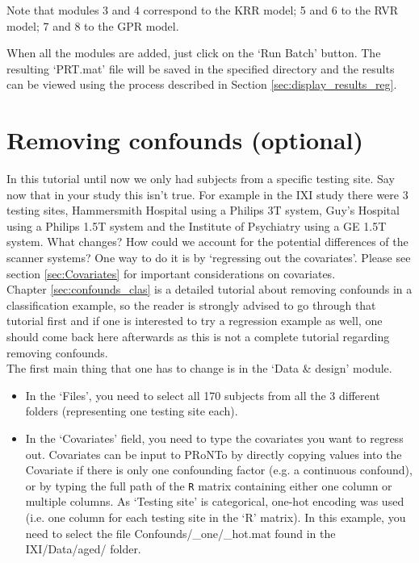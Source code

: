 Note that modules 3 and 4 correspond to the KRR model; 5 and 6 to the RVR model; 7 and 8 to the GPR model.

When all the modules are added, just click on the `Run Batch' button. The resulting `PRT.mat' file will be saved in the specified directory and the results can be viewed using the process described in Section \ref{sec:display_results_reg}.



\section{Removing confounds (optional)}

In this tutorial until now we only had subjects from a specific testing  site. Say now that in your study this isn't true. For example in the IXI study there were 3 testing sites, Hammersmith Hospital using a Philips 3T system, Guy’s Hospital using a Philips 1.5T system and the Institute of Psychiatry using a GE 1.5T system. What changes? How could we account for the potential differences of the scanner systems? One way to do it is by `regressing out the covariates'. Please see section \ref{sec:Covariates} for important considerations on covariates.
\\
Chapter \ref{sec:confounds_clas} is a detailed tutorial about removing confounds in a classification example, so the reader is strongly advised to go through that tutorial first and if one is interested to try a regression example as well, one should come back here afterwards as this is not a complete tutorial regarding removing confounds.
\\

The first main thing that one has to change is in the `Data \& design' module.

\begin{itemize}
    
    \item In the `Files', you need to select all 170 subjects from all the 3 different folders (representing one testing site each).
    
    \item In the `Covariates' field, you need to type the covariates you want to regress out. Covariates can be input to PRoNTo by directly copying values into the Covariate if there is only one confounding factor (e.g. a continuous confound), or by typing the full path of the {\tt R} matrix containing either one column or multiple columns. As `Testing site' is categorical, one-hot encoding was used (i.e. one column for each testing site in the `R' matrix). In this example, you need to select the file Confounds/\_one/\_hot.mat found in the IXI/Data/aged/ folder.
    
    \end{itemize}
    
